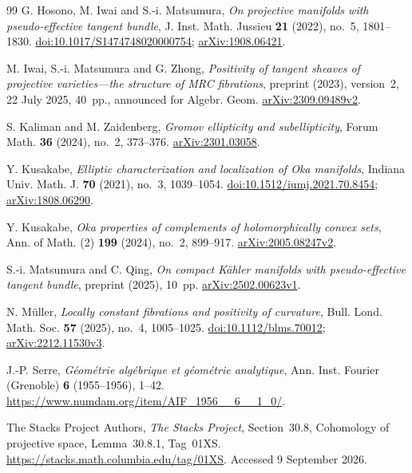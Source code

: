 \documentclass[12pt]{amsart}
\theoremstyle{definition}
\theoremstyle{remark}
\numberwithin{equation}{section}
\begin{document}
\begin{thebibliography}{99}
G. Hosono, M. Iwai and S.-i. Matsumura,
\emph{On projective manifolds with pseudo-effective tangent bundle},
J. Inst. Math. Jussieu \textbf{21} (2022), no.~5, 1801--1830.
\href{https://doi.org/10.1017/S1474748020000754}{doi:10.1017/S1474748020000754};
\href{https://arxiv.org/abs/1908.06421}{arXiv:1908.06421}.

M. Iwai, S.-i. Matsumura and G. Zhong,
\emph{Positivity of tangent sheaves of projective varieties---the structure of MRC fibrations},
preprint (2023), version~2, 22 July 2025, 40~pp., announced for Algebr. Geom.
\href{https://arxiv.org/abs/2309.09489v2}{arXiv:2309.09489v2}.

S. Kaliman and M. Zaidenberg, \emph{Gromov ellipticity and subellipticity},
Forum Math. \textbf{36} (2024), no.~2, 373--376.
\href{https://arxiv.org/abs/2301.03058}{arXiv:2301.03058}.

Y. Kusakabe, \emph{Elliptic characterization and localization of Oka manifolds},
Indiana Univ. Math. J. \textbf{70} (2021), no.~3, 1039--1054.
\href{https://doi.org/10.1512/iumj.2021.70.8454}{doi:10.1512/iumj.2021.70.8454};
\href{https://arxiv.org/abs/1808.06290}{arXiv:1808.06290}.

Y. Kusakabe, \emph{Oka properties of complements of holomorphically convex sets},
Ann. of Math. (2) \textbf{199} (2024), no.~2, 899--917.
\href{https://arxiv.org/abs/2005.08247v2}{arXiv:2005.08247v2}.

S.-i. Matsumura and C. Qing,
\emph{On compact K\"ahler manifolds with pseudo-effective tangent bundle},
preprint (2025), 10~pp.
\href{https://arxiv.org/abs/2502.00623v1}{arXiv:2502.00623v1}.

N. M\"uller, \emph{Locally constant fibrations and positivity of curvature},
Bull. Lond. Math. Soc. \textbf{57} (2025), no.~4, 1005--1025.
\href{https://doi.org/10.1112/blms.70012}{doi:10.1112/blms.70012};
\href{https://arxiv.org/abs/2212.11530v3}{arXiv:2212.11530v3}.

J.-P. Serre, \emph{G\'eom\'etrie alg\'ebrique et g\'eom\'etrie analytique},
Ann. Inst. Fourier (Grenoble) \textbf{6} (1955--1956), 1--42.
\url{https://www.numdam.org/item/AIF_1956__6__1_0/}.

The Stacks Project Authors, \emph{The Stacks Project},
Section~30.8, Cohomology of projective space, Lemma~30.8.1, Tag~01XS.
\url{https://stacks.math.columbia.edu/tag/01XS}. Accessed 9 September 2026.

\end{thebibliography}
\end{document}
